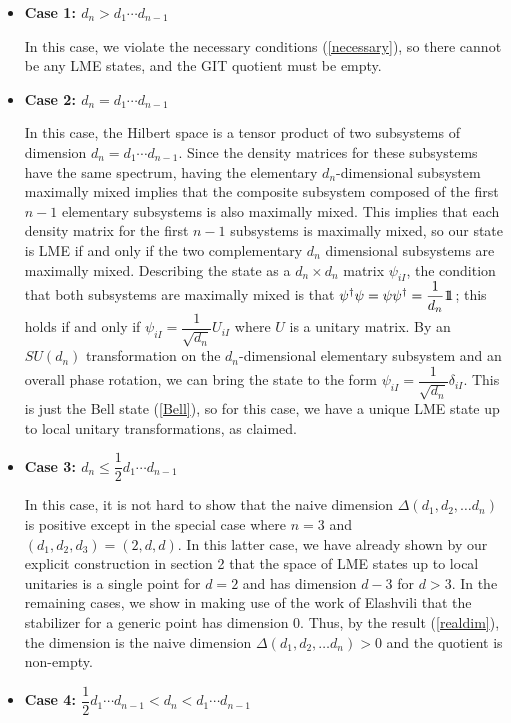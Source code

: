 \documentclass[12pt]{article}
\theoremstyle{definition}
\def\identity{{\rlap{1} \hskip 1.6pt \hbox{1}}}
\begin{document}
\begin{itemize}
\item
{\bf Case 1: $d_n > d_1 \cdots d_{n-1}$}

In this case, we violate the necessary conditions (\ref{necessary}), so there cannot be any LME states, and the GIT quotient must be empty.
\item
{\bf Case 2: $d_n = d_1 \cdots d_{n-1}$}

In this case, the Hilbert space is a tensor product of two subsystems of dimension $d_n = d_1 \cdots d_{n-1}$. Since the density matrices for these subsystems have the same spectrum, having the elementary $d_n$-dimensional subsystem maximally mixed implies that the composite subsystem composed of the first $n-1$ elementary subsystems is also maximally mixed. This implies that each density matrix for the first $n-1$ subsystems is maximally mixed, so our state is LME if and only if the two complementary $d_n$ dimensional subsystems are maximally mixed. Describing the state as a $d_n \times d_n$ matrix $\psi_{i I}$, the condition that both subsystems are maximally mixed is that $\psi^\dagger \psi = \psi \psi^\dagger = \dfrac{1}{ d_n} \identity$; this holds if and only if $\psi_{i I} = \dfrac{1}{\sqrt{d_n}} U_{i I}$ where $U$ is a unitary matrix. By an $SU(d_n)$ transformation on the $d_n$-dimensional elementary subsystem and an overall phase rotation, we can bring the state to the form $\psi_{i I} = \dfrac{1}{\sqrt{d_n}} \delta_{i I}$. This is just the Bell state (\ref{Bell}), so for this case, we have a unique LME state up to local unitary transformations, as claimed.

\item

{\bf Case 3: $d_n \le \dfrac{1}{2} d_1 \cdots d_{n-1}$}

In this case, it is not hard to show that the naive dimension $\Delta(d_1, d_2, \dots d_n)$ is positive except in the special case where $n=3$ and $(d_1, d_2, d_3) = (2,d,d)$. In this latter case, we have already shown by our explicit construction in section 2 that the space of LME states up to local unitaries is a single point for $d=2$ and has dimension $d-3$ for $d > 3$. In the remaining cases, we show in \cite{mathpaper} making use of the work of
Elashvili \cite{elashvili}  that the stabilizer for a generic point has dimension 0. Thus, by the result (\ref{realdim}), the dimension is the naive dimension $\Delta(d_1, d_2, \dots d_n) > 0$ and the quotient is non-empty.


\item
{\bf Case 4: $\dfrac{1}{2} d_1 \cdots d_{n-1} < d_n <  d_1 \cdots d_{n-1}$}


\end{itemize}
\end{document}
